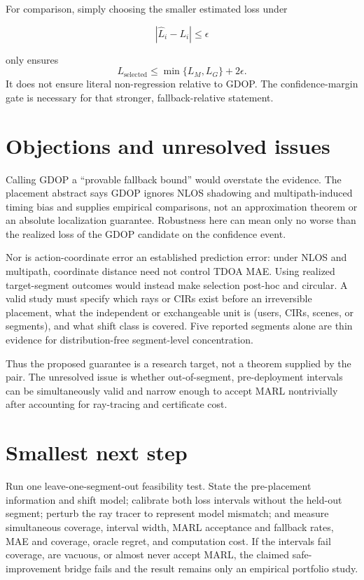 \documentclass{article}
\begin{document}
For comparison, simply choosing the smaller estimated loss under

\[
  |\widehat L_i-L_i|\leq\epsilon
\]

only ensures
\[
  L_{\mathrm{selected}}\leq \min\{L_M,L_G\}+2\epsilon.
\]
It does not ensure literal non-regression relative to GDOP.  The confidence-margin gate is necessary for that stronger, fallback-relative statement. 

\section{Objections and unresolved issues}

Calling GDOP a ``provable fallback bound'' would overstate the evidence.  The placement abstract says GDOP ignores NLOS shadowing and multipath-induced timing bias and supplies empirical comparisons, not an approximation theorem or an absolute localization guarantee.  Robustness here can mean only no worse than the realized loss of the GDOP candidate on the confidence event. 

Nor is action-coordinate error an established prediction error: under NLOS and multipath, coordinate distance need not control TDOA MAE.  Using realized target-segment outcomes would instead make selection post-hoc and circular.  A valid study must specify which rays or CIRs exist before an irreversible placement, what the independent or exchangeable unit is (users, CIRs, scenes, or segments), and what shift class is covered.  Five reported segments alone are thin evidence for distribution-free segment-level concentration. 

Thus the proposed guarantee is a research target, not a theorem supplied by the pair.  The unresolved issue is whether out-of-segment, pre-deployment intervals can be simultaneously valid and narrow enough to accept MARL nontrivially after accounting for ray-tracing and certificate cost. 

\section{Smallest next step}

Run one leave-one-segment-out feasibility test.  State the pre-placement information and shift model; calibrate both loss intervals without the held-out segment; perturb the ray tracer to represent model mismatch; and measure simultaneous coverage, interval width, MARL acceptance and fallback rates, MAE and coverage, oracle regret, and computation cost.  If the intervals fail coverage, are vacuous, or almost never accept MARL, the claimed safe-improvement bridge fails and the result remains only an empirical portfolio study. 
\end{document}
